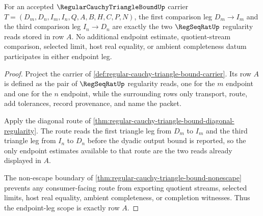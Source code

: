 \begin{theorem}
\label{thm:regular-cauchy-triangle-bound-leg-scope}
For an accepted $\RegularCauchyTriangleBoundUp$ carrier $T=(D_m,D_n,I_m,I_n,Q,A,B,H,C,P,N)$, the first comparison leg $D_m \longrightarrow I_m$ and the third comparison leg $I_n \longrightarrow D_n$ are exactly the two $\RegSeqRatUp$ regularity reads stored in row $A$. No additional endpoint estimate, quotient-stream comparison, selected limit, host real equality, or ambient completeness datum participates in either endpoint leg.
\end{theorem}
\begin{proof}
Project the carrier of \autoref{def:regular-cauchy-triangle-bound-carrier}. Its row $A$ is defined as the pair of $\RegSeqRatUp$ regularity reads, one for the $m$ endpoint and one for the $n$ endpoint, while the surrounding rows only transport, route, add tolerances, record provenance, and name the packet.

Apply the diagonal route of \autoref{thm:regular-cauchy-triangle-bound-diagonal-regularity}. The route reads the first triangle leg from $D_m$ to $I_m$ and the third triangle leg from $I_n$ to $D_n$ before the dyadic output bound is reported, so the only endpoint estimates available to that route are the two reads already displayed in $A$.

The non-escape boundary of \autoref{thm:regular-cauchy-triangle-bound-nonescape} prevents any consumer-facing route from exporting quotient streams, selected limits, host real equality, ambient completeness, or completion witnesses. Thus the endpoint-leg scope is exactly row $A$.
\end{proof}


